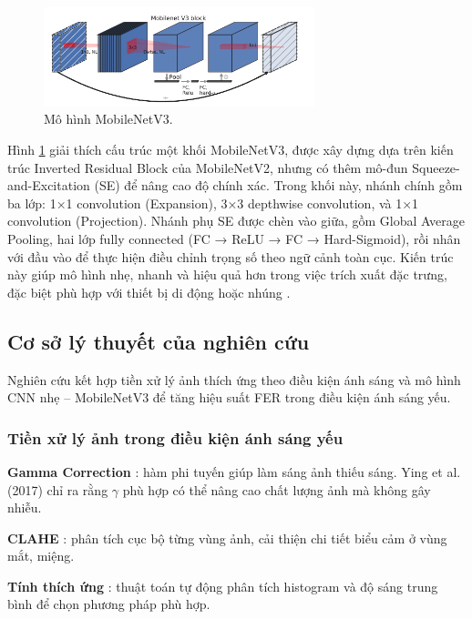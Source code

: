 \begin{figure}[H]
    \centering
    \includegraphics[width=0.7\textwidth]{img/mobinetv3.png} %
    \caption{Mô hình MobileNetV3.}
    \label{fig:emotion_distribution11}
\end{figure}

Hình \ref{fig:emotion_distribution11} giải thích cấu trúc một khối MobileNetV3, được xây dựng dựa trên kiến trúc Inverted Residual Block của MobileNetV2, nhưng có thêm mô-đun Squeeze-and-Excitation (SE) để nâng cao độ chính xác. Trong khối này, nhánh chính gồm ba lớp: 1×1 convolution (Expansion), 3×3 depthwise convolution, và 1×1 convolution (Projection). Nhánh phụ SE được chèn vào giữa, gồm Global Average Pooling, hai lớp fully connected (FC → ReLU → FC → Hard-Sigmoid), rồi nhân với đầu vào để thực hiện điều chỉnh trọng số theo ngữ cảnh toàn cục. Kiến trúc này giúp mô hình nhẹ, nhanh và hiệu quả hơn trong việc trích xuất đặc trưng, đặc biệt phù hợp với thiết bị di động hoặc nhúng \cite{howard2019mobilenetv3}.

\subsection{Cơ sở lý thuyết của nghiên cứu}
Nghiên cứu kết hợp tiền xử lý ảnh thích ứng theo điều kiện ánh sáng và mô hình CNN nhẹ – MobileNetV3 để tăng hiệu suất FER trong điều kiện ánh sáng yếu.

\subsubsection{Tiền xử lý ảnh trong điều kiện ánh sáng yếu}
\textbf{Gamma Correction} \cite{ying2017gamma}: hàm phi tuyến giúp làm sáng ảnh thiếu sáng. Ying et al. (2017) chỉ ra rằng \(\gamma\) phù hợp có thể nâng cao chất lượng ảnh mà không gây nhiễu.\par
\textbf{CLAHE} \cite{pizer1987clahe}: phân tích cục bộ từng vùng ảnh, cải thiện chi tiết biểu cảm ở vùng mắt, miệng.\par
\textbf{Tính thích ứng} \cite{wang2022lowlight}: thuật toán tự động phân tích histogram và độ sáng trung bình để chọn phương pháp phù hợp.

